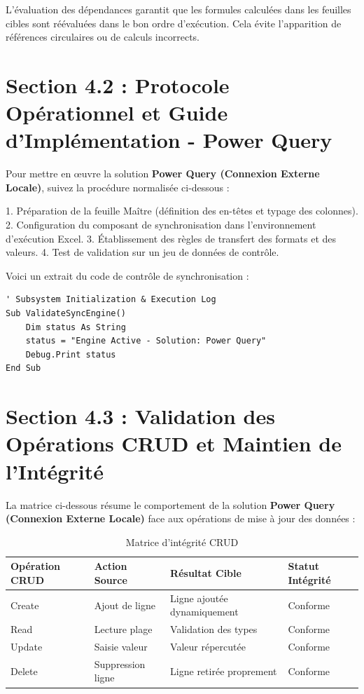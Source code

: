 \documentclass[12pt,a4paper]{report}
\begin{document}
L'évaluation des dépendances garantit que les formules calculées dans les feuilles cibles sont réévaluées dans le bon ordre d'exécution. Cela évite l'apparition de références circulaires ou de calculs incorrects.


\section{Section 4.2 : Protocole Opérationnel et Guide d'Implémentation - Power Query}
Pour mettre en œuvre la solution \textbf{Power Query (Connexion Externe Locale)}, suivez la procédure normalisée ci-dessous :

1. Préparation de la feuille Maître (définition des en-têtes et typage des colonnes).
2. Configuration du composant de synchronisation dans l'environnement d'exécution Excel.
3. Établissement des règles de transfert des formats et des valeurs.
4. Test de validation sur un jeu de données de contrôle.

Voici un extrait du code de contrôle de synchronisation :
\begin{lstlisting}[caption=Code de controle operationnel]
' Subsystem Initialization & Execution Log
Sub ValidateSyncEngine()
    Dim status As String
    status = "Engine Active - Solution: Power Query"
    Debug.Print status
End Sub
\end{lstlisting}


\section{Section 4.3 : Validation des Opérations CRUD et Maintien de l'Intégrité}
La matrice ci-dessous résume le comportement de la solution \textbf{Power Query (Connexion Externe Locale)} face aux opérations de mise à jour des données :

\begin{table}[h]
\centering
\begin{tabular}{@{}llll@{}}
\toprule
\textbf{Opération CRUD} & \textbf{Action Source} & \textbf{Résultat Cible} & \textbf{Statut Intégrité} \\ \midrule
Create & Ajout de ligne & Ligne ajoutée dynamiquement & Conforme \\
Read & Lecture plage & Validation des types & Conforme \\
Update & Saisie valeur & Valeur répercutée & Conforme \\
Delete & Suppression ligne & Ligne retirée proprement & Conforme \\ \bottomrule
\end{tabular}
\caption{Matrice d'intégrité CRUD}
\end{table}
\end{document}
